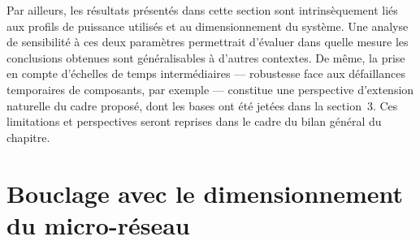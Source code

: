 Par ailleurs, les résultats présentés dans cette section sont intrinsèquement liés aux profils de puissance utilisés et au dimensionnement du système. Une analyse de sensibilité à ces deux paramètres permettrait d'évaluer dans quelle mesure les conclusions obtenues sont généralisables à d'autres contextes. De même, la prise en compte d'échelles de temps intermédiaires — robustesse face aux défaillances temporaires de composants, par exemple — constitue une perspective d'extension naturelle du cadre proposé, dont les bases ont été jetées dans la section~3. Ces limitations et perspectives seront reprises dans le cadre du bilan général du chapitre.

\section{Bouclage avec le dimensionnement du micro-réseau}
\lipsum[1]